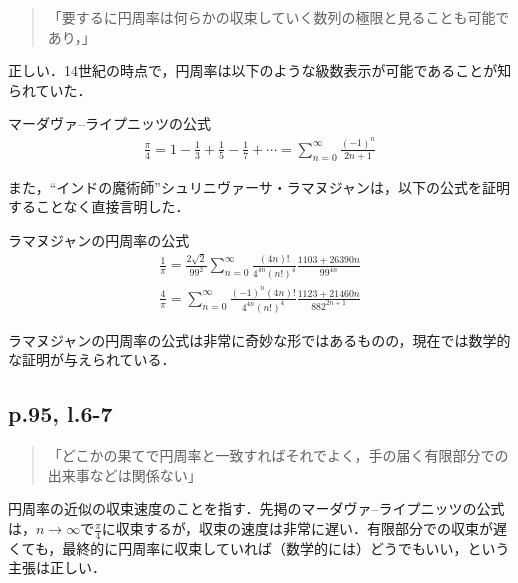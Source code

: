 \documentclass[10pt, a5paper, twoside]{ltjsarticle}
\newcommand{\hyphen}{\insertkanjiskip--\insertkanjiskip}
\begin{document}
            \begin{quote}
                「要するに円周率は何らかの収束していく数列の極限と見ることも可能であり，」
            \end{quote}

            正しい．14世紀の時点で，円周率は以下のような級数表示が可能であることが知られていた．

            \begin{thm}{マーダヴァ\hyphen ライプニッツの公式}{}
                \begin{align*}
                    \frac{\pi}{4} = 1 - \frac{1}{3} + \frac{1}{5} - \frac{1}{7} + \cdots = \sum_{n=0}^{\infty} \frac{(-1)^n}{2n+1}
                \end{align*}
            \end{thm}

            また，“インドの魔術師”シュリニヴァーサ・ラマヌジャンは，以下の公式を証明することなく直接言明した\cite{hardy,ramanujan}．

            \begin{thm}{ラマヌジャンの円周率の公式}{}
                \begin{align*}
                    \frac{1}{\pi} = \frac{2 \sqrt{2}}{99^2} \sum^{\infty}_{n=0} \frac{(4n)!}{4^{4n}(n!)^4} \frac{1103+26390n}{99^{4n}} \\ \frac{4}{\pi} = \sum^{\infty}_{n=0} \frac{(-1)^n (4n)!}{4^{4n} (n!)^4} \frac{1123+21460n}{882^{2n+1}}
                \end{align*}
            \end{thm}

            ラマヌジャンの円周率の公式は非常に奇妙な形ではあるものの，現在では数学的な証明が与えられている．

            \subsection{p.95, l.6-7}

            \begin{quote}
                「どこかの果てで円周率と一致すればそれでよく，手の届く有限部分での出来事などは関係ない」
            \end{quote}

            円周率の近似の収束速度のことを指す．先掲のマーダヴァ\hyphen ライプニッツの公式は，$n \to \infty$で$\displaystyle \frac{\pi}{4}$に収束するが，収束の速度は非常に遅い．有限部分での収束が遅くても，最終的に円周率に収束していれば（数学的には）どうでもいい，という主張は正しい．
\end{document}
